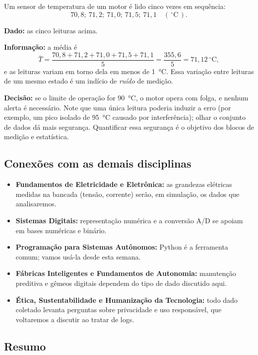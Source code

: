 Um sensor de temperatura de um motor é lido cinco vezes em sequência:
\[
  70{,}8;\ 71{,}2;\ 71{,}0;\ 71{,}5;\ 71{,}1\quad (\,^{\circ}\mathrm{C}\,).
\]
 
\textbf{Dado:} as cinco leituras acima.
 
\textbf{Informação:} a média é
\[
  \bar{T} = \frac{70{,}8+71{,}2+71{,}0+71{,}5+71{,}1}{5} = \frac{355{,}6}{5} = 71{,}12\ ^{\circ}\mathrm{C},
\]
e as leituras variam em torno dela em menos de \qty{1}{\degreeCelsius}. Essa variação entre leituras de um mesmo estado é um indício de \emph{ruído} de medição.
 
\textbf{Decisão:} se o limite de operação for \qty{90}{\degreeCelsius}, o motor opera com folga, e nenhum alerta é necessário. Note que uma única leitura poderia induzir a erro (por exemplo, um pico isolado de \qty{95}{\degreeCelsius} causado por interferência); olhar o conjunto de dados dá mais segurança. Quantificar essa segurança é o objetivo dos blocos de medição e estatística.
 
\subsection{Conexões com as demais disciplinas}
 
\begin{itemize}
  \item \textbf{Fundamentos de Eletricidade e Eletrônica:} as grandezas elétricas medidas na bancada (tensão, corrente) serão, em simulação, os dados que analisaremos.
  \item \textbf{Sistemas Digitais:} representação numérica e a conversão A/D se apoiam em bases numéricas e binário.
  \item \textbf{Programação para Sistemas Autônomos:} Python é a ferramenta comum; vamos usá-la desde esta semana.
  \item \textbf{Fábricas Inteligentes e Fundamentos de Autonomia:} manutenção preditiva e gêmeos digitais dependem do tipo de dado discutido aqui.
  \item \textbf{Ética, Sustentabilidade e Humanização da Tecnologia:} todo dado coletado levanta perguntas sobre privacidade e uso responsável, que voltaremos a discutir ao tratar de logs.
\end{itemize}
 
\subsection{Resumo}
 
